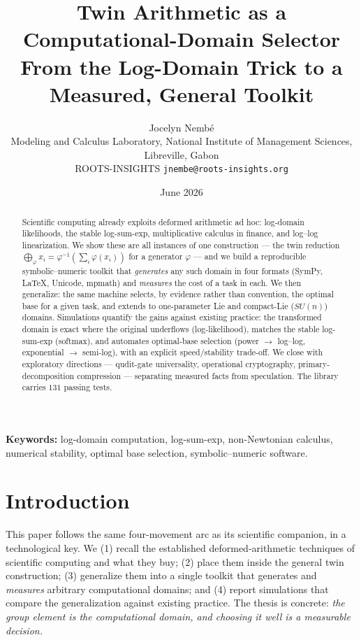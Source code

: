 \documentclass[11pt,a4paper]{article}
\title{\textbf{Twin Arithmetic as a Computational-Domain Selector}\\[0.3em]
\large From the Log-Domain Trick to a Measured, General Toolkit}
\author{Jocelyn Nemb\'e\\
\small Modeling and Calculus Laboratory, National Institute of Management
Sciences, Libreville, Gabon\\
\small ROOTS-INSIGHTS \quad\textbar\quad \texttt{jnembe@roots-insights.org}}
\date{June 2026}
\theoremstyle{definition}
\begin{document}
\maketitle

\begin{abstract}
\noindent
Scientific computing already exploits deformed arithmetic ad hoc: log-domain
likelihoods, the stable log-sum-exp, multiplicative calculus in finance, and
log--log linearization. We show these are all instances of one construction ---
the twin reduction $\bigoplus_\varphi x_i=\varphi^{-1}(\sum_i\varphi(x_i))$ for a
generator $\varphi$ --- and we build a reproducible symbolic--numeric toolkit
that \emph{generates} any such domain in four formats (SymPy, \LaTeX, Unicode,
mpmath) and \emph{measures} the cost of a task in each. We then generalize:
the same machine selects, by evidence rather than convention, the optimal base
for a given task, and extends to one-parameter Lie and compact-Lie ($SU(n)$)
domains. Simulations quantify the gains against existing practice: the
transformed domain is exact where the original underflows (log-likelihood),
matches the stable log-sum-exp (softmax), and automates optimal-base selection
(power $\to$ log--log, exponential $\to$ semi-log), with an explicit
speed/stability trade-off. We close with exploratory directions --- qudit-gate
universality, operational cryptography, primary-decomposition compression ---
separating measured facts from speculation. The library carries $131$ passing
tests.
\end{abstract}

\noindent\textbf{Keywords:} log-domain computation, log-sum-exp, non-Newtonian
calculus, numerical stability, optimal base selection, symbolic--numeric
software.

\section{Introduction}

This paper follows the same four-movement arc as its scientific companion, in a
technological key. We (1) recall the established deformed-arithmetic techniques
of scientific computing and what they buy; (2) place them inside the general
twin construction; (3) generalize them into a single toolkit that generates and
\emph{measures} arbitrary computational domains; and (4) report simulations that
compare the generalization against existing practice. The thesis is concrete:
\emph{the group element is the computational domain, and choosing it well is a
measurable decision.}
\end{document}

